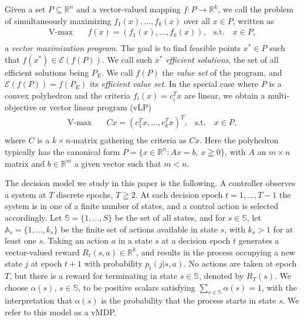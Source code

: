 \documentclass{article}
\theoremstyle{definition}
\numberwithin{equation}{section}
\begin{document}
{Given a set $P \subseteq \mathbb{R}^n$ and a vector-valued mapping $f: P \to \mathbb{R}^k$, we call 
the problem of simultaneously maximizing $f_1(x),\dots,f_k(x)$
over all $x\in P$, written as 
\begin{equation*}
\begin{aligned}
\operatorname{V-max} \quad & f(x) = (f_1(x), ..., f_k(x)), & \textrm{s.t.} \quad x \in P,\\
\end{aligned}
\end{equation*}
a \textit{vector maximization program}. The goal is to find feasible points $x^*\in P$ such that $f(x^*) \in \mathscr E(f(P))$.  
We call such $x^*$ \textit{efficient solutions},
the set of all efficient solutions being  $P_E$. We call $f(P)$ the {\it value set} of the program,
and $\mathscr{E}(f(P))=f(P_E)$ its \textit{efficient value set}. In the special case where $P$ is a convex polyhedron and the criteria $f_i(x) = c_i^{T}x$ %
are linear, we obtain a multi-objective or vector linear program (vLP)
\begin{equation}
\tag{vLP}
\label{vLP}
\begin{aligned}
\operatorname{V-max} \quad & Cx = (c_1^{T}x, ..., c_k^{T}x)^T, & \textrm{s.t.} \quad x \in P,\\
\end{aligned}
\end{equation}
where $C$ is a $k \times n$-matrix gathering the criteria as $Cx$.  
Here the polyhedron typically has the canonical form
$P = \{x \in \mathbb{R}^n: Ax = b,\, x \geqq 0\}$, with $A$ an $m \times n$ matrix and $b \in \mathbb{R}^m$ a given vector such that $m < n$.
%



The decision model we study in this paper is the following. A controller observes a system at $T$ discrete epochs, $T \geqq2$. At each decision epoch $t = 1, ..., T-1$ the system is in one of a finite number of states, and a control action is selected accordingly. Let $\mathbb{S} = \{1, ..., S\}$ be the set of all states, and for $s \in \mathbb{S}$, let $\mathbb{A}_s = \{1, ..., k_s\}$ be the finite set of actions available in state $s$, with $k_s > 1$ for at least one $s$. Taking an action $a$ in a state $s$ at a decision epoch $t$ generates a vector-valued reward $R_t(s, a) \in \mathbb{R}^k$, and results in the process occupying a new state $j$ at epoch $t+1$ with probability $p_t(j | s, a)$. No actions are taken at epoch $T$, but there is a reward for terminating in state $s\in \mathbb{S}$, denoted by $R_T(s)$. We choose $\alpha(s)$, $s \in \mathbb{S}$, to be positive scalars satisfying $\sum_{s \in \mathbb{S}} \alpha(s) = 1$, with the interpretation that $\alpha(s)$ is the probability that the process starts in state $s$. We refer to this model as a vMDP. 

}
\end{document}
